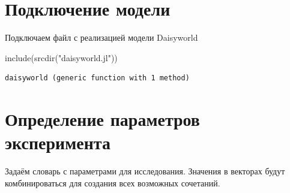 \documentclass[
  12pt,
  a4paper,
  DIV=11,
  numbers=noendperiod]{scrreprt}
\newenvironment{Shaded}{\begin{snugshade}}{\end{snugshade}}
\newcommand{\FunctionTok}[1]{\textcolor[rgb]{0.28,0.35,0.67}{#1}}
\newcommand{\NormalTok}[1]{\textcolor[rgb]{0.00,0.23,0.31}{#1}}
\newcommand{\StringTok}[1]{\textcolor[rgb]{0.13,0.47,0.30}{#1}}
\begin{document}
\section{Подключение
модели}\label{ux43fux43eux434ux43aux43bux44eux447ux435ux43dux438ux435-ux43cux43eux434ux435ux43bux438-3}

Подключаем файл с реализацией модели Daisyworld

\begin{Shaded}
\begin{Highlighting}[]
\FunctionTok{include}\NormalTok{(}\FunctionTok{srcdir}\NormalTok{(}\StringTok{"daisyworld.jl"}\NormalTok{))}
\end{Highlighting}
\end{Shaded}

\begin{verbatim}
daisyworld (generic function with 1 method)
\end{verbatim}

\section{Определение параметров
эксперимента}\label{ux43eux43fux440ux435ux434ux435ux43bux435ux43dux438ux435-ux43fux430ux440ux430ux43cux435ux442ux440ux43eux432-ux44dux43aux441ux43fux435ux440ux438ux43cux435ux43dux442ux430}

Задаём словарь с параметрами для исследования. Значения в векторах будут
комбинироваться для создания всех возможных сочетаний.
\end{document}
